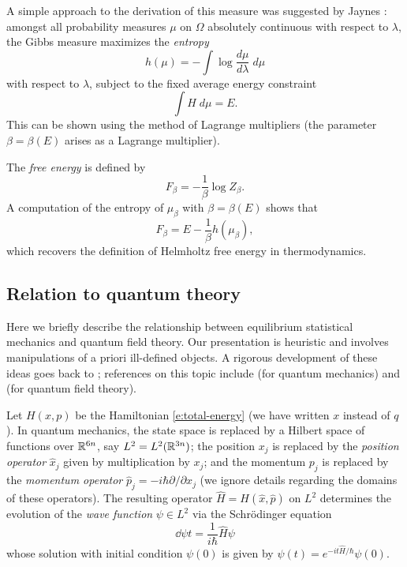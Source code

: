 A simple approach to the derivation of this measure was suggested by Jaynes \cite{Jaynes57}:
amongst all probability measures $\mu$ on $\Omega$ absolutely
continuous with respect to $\lambda$, the Gibbs measure maximizes the \emph{entropy}
\begin{equation}
\label{e:entropy-def}
h(\mu) = -\int \log \frac{d\mu}{d\lambda} \; d\mu
\end{equation}
with respect to $\lambda$, subject to the fixed average energy constraint
\begin{equation}
\int H \; d\mu = E.
\end{equation}
This can be shown using the method of Lagrange multipliers
(the parameter $\beta = \beta(E)$ arises as a Lagrange multiplier).

The \emph{free energy} is defined by
\begin{equation}
F_\beta = -\frac{1}{\beta} \log Z_\beta.
\end{equation}
A computation of the entropy of $\mu_\beta$ with $\beta = \beta(E)$ shows that
\begin{equation}
F_\beta = E - \frac{1}{\beta} h(\mu_\beta),
\end{equation}
which recovers the definition of Helmholtz free energy in thermodynamics.

\subsection{Relation to quantum theory}

Here we briefly describe the relationship between equilibrium statistical
mechanics and quantum field theory. Our presentation is heuristic and involves
manipulations of a priori ill-defined objects. A rigorous development of these
ideas goes back to \cite{Syma69,Nelson73,OS73,OS75}; references on this topic
include \cite{Simon05} (for quantum mechanics) and \cite{GJ87} (for quantum
field theory).

Let $H(x, p)$ be the Hamiltonian \eqref{e:total-energy} (we have written $x$
instead of $q$). In quantum mechanics, the state space is replaced by a Hilbert
space of functions over ${\mathbb R}^{6n}$, say $L^2 = L^2({\mathbb R}^{3n})$;
the position $x_j$ is replaced by the \emph{position operator} $\hat x_j$ given by
multiplication by $x_j$; and the momentum $p_j$ is replaced by the \emph{momentum
operator} $\hat p_j = -i \hbar \partial/\partial x_j$ (we ignore details regarding
the domains of these operators). The resulting operator $\hat H = H(\hat x, \hat p)$
on $L^2$ determines the evolution of the \emph{wave function} $\psi\in L^2$ via
the Schr\"{o}dinger equation
\begin{equation}
\dd{\psi}{t} = \frac{1}{i\hbar} \hat H \psi
\end{equation}
whose solution with initial condition $\psi(0)$ is given by
$\psi(t) = e^{-it\hat H/\hbar} \psi(0)$.

